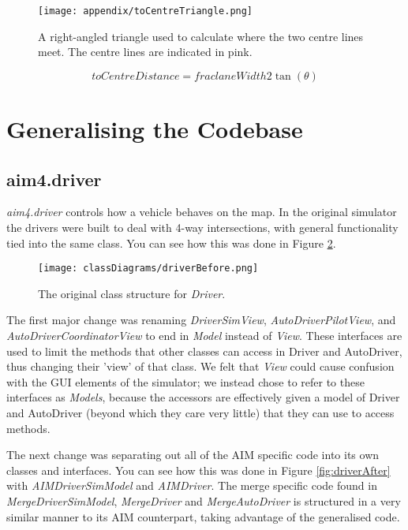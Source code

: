 \begin{appendices}
\begin{figure}[htb]
\texttt{[image: appendix/toCentreTriangle.png]}
\caption{A right-angled triangle used to calculate where the two centre lines meet. The centre lines are indicated in pink.}
\label{fig:toCentreTriangle}
\end{figure}

\begin{equation}\label{aTan}
toCentreDistance = frac{laneWidth}{2 \tan(\theta)}
\end{equation}

\section{Generalising the Codebase}
\label{sec:Generalising the Codebase Appendix}

\subsection{aim4.driver}
\label{subsec:aim4.driver}
\emph{aim4.driver} controls how a vehicle behaves on the map. In the original simulator the drivers were built to deal with 4-way intersections, with general functionality tied into the same class. You can see how this was done in Figure \ref{fig:driverBefore}.

\begin{figure}[htb]
\texttt{[image: classDiagrams/driverBefore.png]}
\caption{The original class structure for \emph{Driver}.}
\label{fig:driverBefore}
\end{figure}

The first major change was renaming \emph{DriverSimView}, \emph{AutoDriverPilotView}, and \emph{AutoDriverCoordinatorView} to end in \emph{Model} instead of \emph{View}. These interfaces are used to limit the methods that other classes can access in Driver and AutoDriver, thus changing their 'view' of that class. We felt that \emph{View} could cause confusion with the GUI elements of the simulator; we instead chose to refer to these interfaces as \emph{Models}, because the accessors are effectively given a model of Driver and AutoDriver (beyond which they care very little) that they can use to access methods.

The next change was separating out all of the AIM specific code into its own classes and interfaces. You can see how this was done in Figure \ref{fig:driverAfter} with \emph{AIMDriverSimModel} and \emph{AIMDriver}. The merge specific code found in \emph{MergeDriverSimModel}, \emph{MergeDriver} and \emph{MergeAutoDriver} is structured in a very similar manner to its AIM counterpart, taking advantage of the generalised code.


\end{appendices}
